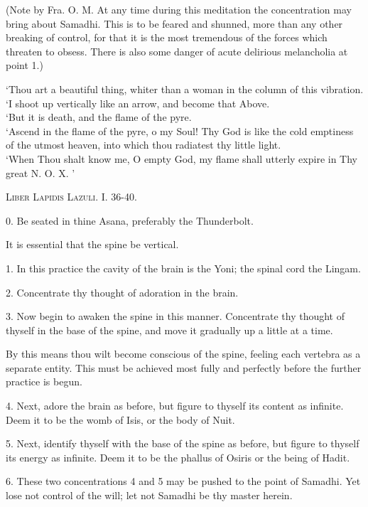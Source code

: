 (Note by Fra. O. M. At any time during this meditation the concentration may bring about Samadhi. This is to be feared and shunned, more than any other breaking of control, for that it is the most tremendous of the forces which threaten to obsess. There is also some danger of acute delirious melancholia at point 1.)


\pagebreak


\epigraph{
`Thou art a beautiful thing, whiter than a woman in the column of this vibration. \\
`I shoot up vertically like an arrow, and become that Above. \\
`But it is death, and the flame of the pyre. \\
`Ascend in the flame of the pyre, o my Soul! Thy God is like the cold emptiness of the utmost heaven, into which thou radiatest thy little light. \\
`When Thou shalt know me, O empty God, my flame shall utterly expire in Thy great N.\nolinebreak{} O.\nolinebreak{} X.\nolinebreak{} ' }{\textsc{Liber Lapidis Lazuli. I. 36-40.}}


0. Be seated in thine Asana, preferably the Thunderbolt.

It is essential that the spine be vertical.

1. In this practice the cavity of the brain is the Yoni; the spinal cord the Lingam.

2. Concentrate thy thought of adoration in the brain.

3. Now begin to awaken the spine in this manner. Concentrate thy thought of thyself in the base of the spine, and move it gradually up a little at a time.

By this means thou wilt become conscious of the spine, feeling each vertebra as a separate entity. This must be achieved most fully and perfectly before the further practice is begun.

4. Next, adore the brain as before, but figure to thyself its content as infinite. Deem it to be the womb of Isis, or the body of Nuit.

5. Next, identify thyself with the base of the spine as before, but figure to thyself its energy as infinite. Deem it to be the phallus of Osiris or the being of Hadit.

6. These two concentrations 4 and 5 may be pushed to the point of Samadhi. Yet lose not control of the will; let not Samadhi be thy master herein.

